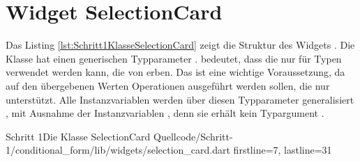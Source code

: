 

\section{Widget SelectionCard}

Das Listing \ref{lst:Schritt1KlasseSelectionCard} zeigt die Struktur des Widgets .
Die Klasse hat einen generischen Typparameter .  bedeutet, dass die  nur für Typen verwendet werden kann, die von  erben. Das ist eine wichtige Voraussetzung, da auf den übergebenen Werten Operationen ausgeführt werden sollen, die nur  unterstützt. Alle Instanzvariablen werden über diesen Typparameter generalisiert , mit Ausnahme der Instanzvariablen , denn sie erhält kein Typargument .

\begin{alexlisting}{Schritt 1}{Die Klasse SelectionCard}
  {Quellcode/Schritt-1/conditional_form/lib/widgets/selection_card.dart}
  {firstline=7, lastline=31}
  \label{lst:Schritt1KlasseSelectionCard}
\end{alexlisting}

